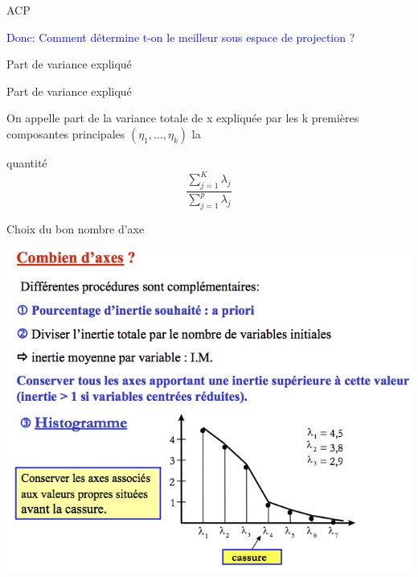\documentclass[10pt]{beamer}
\begin{document}



\begin{frame}{ACP }


\begin{Large}
\textcolor{blue}{Donc: Comment détermine t-on le meilleur sous espace de projection ?}
\end{Large}

\end{frame}





\begin{frame}{Part de variance expliqué }

 \begin{block}{Part de variance expliqué}
 
 On appelle part de la variance totale de x expliquée par les k
premières composantes principales $(\eta_1, \ldots, \eta_k)$ la 

quantité  $$ \frac{\sum_{j=1}^K\lambda_j}{\sum_{j=1}^p\lambda_j} $$ 
 
 \end{block}

\end{frame}


\begin{frame}{ Choix du bon nombre d'axe}


 \includegraphics[scale=0.4]{Kaiser.png}

\end{frame}
\end{document}
